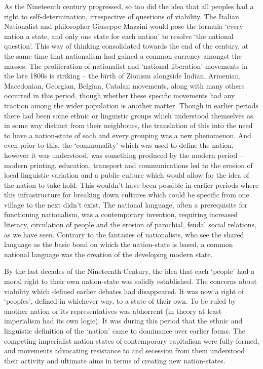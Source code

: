 As the Nineteenth century progressed, so too did the idea that all peoples had a right to self-determination, irrespective of questions of viability.
The Italian Nationalist and philosopher Giuseppe Mazzini would pose the formula ‘every nation a state, and only one state for each nation’ to resolve ‘the national question’.
This way of thinking consolidated towards the end of the century, at the same time that nationalism had gained a common currency amongst the masses.
The proliferation of nationalist and ‘national liberation’ movements in the late 1800s is striking – the birth of Zionism alongside Indian, Armenian, Macedonian, Georgian, Belgian, Catalan movements, along with many others occurred in this period, though whether these specific movements had any traction among the wider population is another matter.
Though in earlier periods there had been some ethnic or linguistic groups which understood themselves as in some way distinct from their neighbours, the translation of this into the need to have a nation-state of each and every grouping was a new phenomenon.
And even prior to this, the ‘commonality’ which was used to define the nation, however it was understood, was something produced by the modern period – modern printing, education, transport and communications led to the erosion of local linguistic variation and a public culture which would allow for the idea of the nation to take hold.
This wouldn’t have been possible in earlier periods where this infrastructure for breaking down cultures which could be specific from one village to the next didn’t exist.
The national language, often a prerequisite for functioning nationalism, was a contemporary invention, requiring increased literacy, circulation of people and the erosion of parochial, feudal social relations, as we have seen.
Contrary to the fantasies of nationalists, who see the shared language as the basic bond on which the nation-state is based, a common national language was the creation of the developing modern state.

By the last decades of the Nineteenth Century, the idea that each ‘people’ had a moral right to their own nation-state was solidly established.
The concerns about viability which defined earlier debates had disappeared.
It was now a right of ‘peoples’, defined in whichever way, to a state of their own.
To be ruled by another nation or its representatives was abhorrent (in theory at least – imperialism had its own logic).
It was during this period that the ethnic and linguistic definition of the ‘nation’ came to dominance over earlier forms.
The competing imperialist nation-states of contemporary capitalism were fully-formed, and movements advocating resistance to and secession from them understood their activity and ultimate aims in terms of creating new nation-states.

